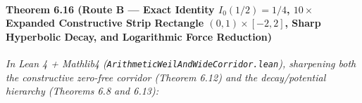 \documentclass[
  11pt,
]{article}
\begin{document}
\paragraph{\texorpdfstring{Theorem 6.16 (Route B --- Exact Identity
\(I_0(1/2) = 1/4\), \(10\times\) Expanded Constructive Strip Rectangle
\((0, 1) \times [-2, 2]\), Sharp Hyperbolic Decay, and Logarithmic Force
Reduction)}{Theorem 6.16 (Route B --- Exact Identity I\_0(1/2) = 1/4, 10\textbackslash times Expanded Constructive Strip Rectangle (0, 1) \textbackslash times {[}-2, 2{]}, Sharp Hyperbolic Decay, and Logarithmic Force Reduction)}}\label{theorem-6.16-route-b-exact-identity-i_012-14-10times-expanded-constructive-strip-rectangle-0-1-times--2-2-sharp-hyperbolic-decay-and-logarithmic-force-reduction}

\emph{In Lean 4 + Mathlib4
(\texttt{ArithmeticWeilAndWideCorridor.lean}), sharpening both the
constructive zero-free corridor (Theorem 6.12) and the decay/potential
hierarchy (Theorems 6.8 and 6.13):}
\end{document}
